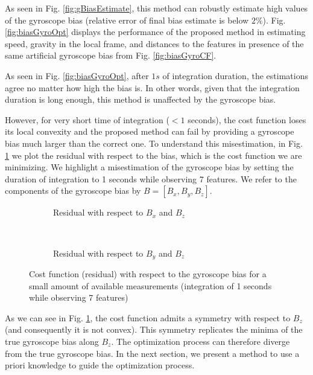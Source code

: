 \documentclass[letterpaper, 10 pt, conference]{ieeeconf}  %
\begin{document}
As seen in Fig. \ref{fig:gBiasEstimate}, this method can robustly estimate high values of the gyroscope bias (relative error of final bias estimate is below $2\%$).
Fig. \ref{fig:biasGyroOpt} displays the performance of the proposed method in estimating speed, gravity in the local frame, and distances to the features in presence of the same artificial gyroscope bias from Fig. \ref{fig:biasGyroCF}.

As seen in Fig. \ref{fig:biasGyroOpt}, after $1s$ of integration duration, the estimations agree no matter how high the bias is.
In other words, given that the integration duration is long enough, this method is unaffected by the gyroscope bias.

However, for very short time of integration ($<1$ seconds), the cost function loses its local convexity and the proposed method can fail by providing a gyroscope bias much larger than the correct one.
To understand this misestimation, in Fig. \ref{fig:cost} we plot the residual with respect to the bias, which is the cost function we are minimizing.
We highlight a misestimation of the gyroscope bias by setting the duration of integration to 1 seconds while observing 7 features.
We refer to the components of the gyroscope bias by $B = [B_x, B_y, B_z]$.

\begin{figure}
        \centering
        \begin{subfigure}[b]{0.489\columnwidth}
                \resizebox{\columnwidth}{!}{}
                \caption{Residual with respect to $B_x$ and $B_z$}
        \end{subfigure}~
        \begin{subfigure}[b]{0.489\columnwidth}
                \resizebox{\columnwidth}{!}{}
                \caption{Residual with respect to $B_y$ and $B_z$}
        \end{subfigure}
        \caption{Cost function (residual) with respect to the gyroscope bias for a small amount of available measurements (integration of 1 seconds while observing 7 features)\label{fig:cost}}
\end{figure}

As we can see in Fig. \ref{fig:cost}, the cost function admits a symmetry with respect to $B_z$ (and consequently it is not convex).
This symmetry replicates the minima of the true gyroscope bias along $B_z$.
The optimization process can therefore diverge from the true gyroscope bias.
In the next section, we present a method to use a priori knowledge to guide the optimization process.
\end{document}
